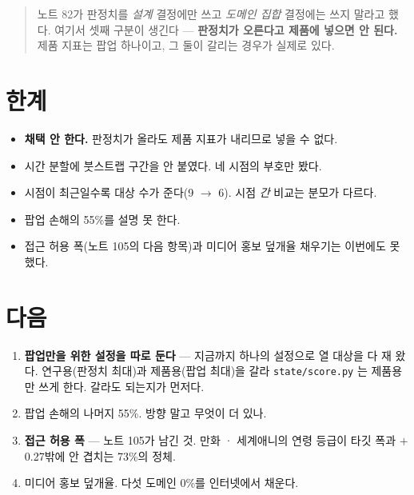 \documentclass[10pt]{article}
\begin{document}

\begin{quote}\fontsize{9.5}{11.5}\selectfont
노트 82가 판정치를 \emph{설계} 결정에만 쓰고 \emph{도메인 집합} 결정에는
쓰지 말라고 했다. 여기서 셋째 구분이 생긴다 --- \textbf{판정치가 오른다고
제품에 넣으면 안 된다.} 제품 지표는 팝업 하나이고, 그 둘이 갈리는 경우가
실제로 있다.
\end{quote}

\section{한계}

\begin{itemize}[leftmargin=1.1em,itemsep=0.15em]
\item \textbf{채택 안 한다.} 판정치가 올라도 제품 지표가 내리므로 넣을 수 없다.
\item 시간 분할에 붓스트랩 구간을 안 붙였다. 네 시점의 부호만 봤다.
\item 시점이 최근일수록 대상 수가 준다(9 $\to$ 6). 시점 \emph{간} 비교는
      분모가 다르다.
\item 팝업 손해의 55\%를 설명 못 한다.
\item 접근 허용 폭(노트 105의 다음 항목)과 미디어 홍보 덮개율 채우기는
      이번에도 못 했다.
\end{itemize}

\section{다음}

\begin{enumerate}[leftmargin=1.3em,itemsep=0.15em]
\item \textbf{팝업만을 위한 설정을 따로 둔다} --- 지금까지 하나의 설정으로
      열 대상을 다 재 왔다. 연구용(판정치 최대)과 제품용(팝업 최대)을 갈라
      \texttt{state/score.py} 는 제품용만 쓰게 한다. 갈라도 되는지가 먼저다.
\item 팝업 손해의 나머지 55\%. 방향 말고 무엇이 더 있나.
\item \textbf{접근 허용 폭} --- 노트 105가 남긴 것. 만화 · 세계애니의 연령
      등급이 타깃 폭과 $+$0.27밖에 안 겹치는 73\%의 정체.
\item 미디어 홍보 덮개율. 다섯 도메인 0\%를 인터넷에서 채운다.
\end{enumerate}
\end{document}
